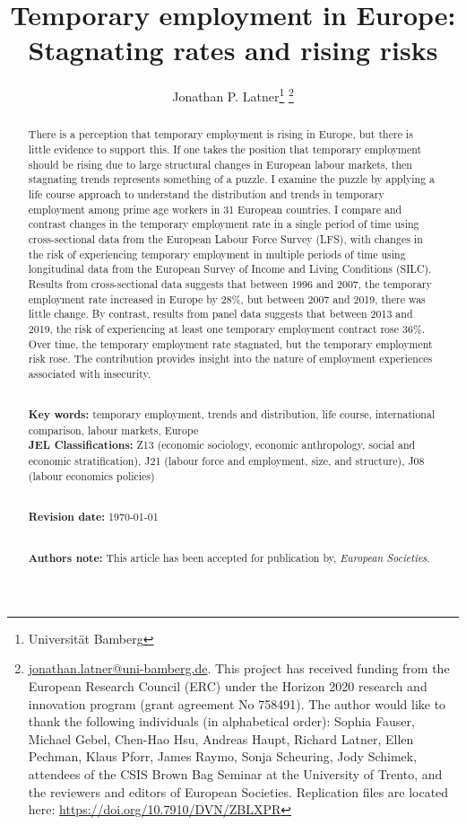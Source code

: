 \documentclass[12pt]{article}
\title{Temporary employment in Europe: Stagnating rates and rising risks}
\author{Jonathan P. Latner\thanks{Universit{\"a}t Bamberg} \footnote{\url{jonathan.latner@uni-bamberg.de}.  This project has received funding from the European Research Council (ERC) under the Horizon 2020 research and innovation program (grant agreement No 758491).  The author would like to thank the following individuals (in alphabetical order):  Sophia Fauser, Michael Gebel, Chen-Hao Hsu, Andreas Haupt, Richard Latner, Ellen Pechman, Klaus Pforr, James Raymo, Sonja Scheuring, Jody Schimek, attendees of the CSIS Brown Bag Seminar at the University of Trento, and the reviewers and editors of European Societies.  Replication files are located here:  \url{https://doi.org/10.7910/DVN/ZBLXPR}}}
\date{\vspace{-5ex}}
\newcommand\wordcounttot{}
\begin{document}
\maketitle

\begin{abstract}

\noindent 
There is a perception that temporary employment is rising in Europe, but there is little evidence to support this.  If one takes the position that temporary employment should be rising due to large structural changes in European labour markets, then stagnating trends represents something of a puzzle.  I examine the puzzle by applying a life course approach to understand the distribution and trends in temporary employment among prime age workers in 31 European countries.  I compare and contrast changes in the temporary employment rate in a single period of time using cross-sectional data from the European Labour Force Survey (LFS), with changes in the risk of experiencing temporary employment in multiple periods of time using longitudinal data from the European Survey of Income and Living Conditions (SILC).  Results from cross-sectional data suggests that between 1996 and 2007, the temporary employment rate increased in Europe by 28\%, but between 2007 and 2019, there was little change.  By contrast, results from panel data suggests that between 2013 and 2019, the risk of experiencing at least one temporary employment contract rose 36\%.  Over time, the temporary employment rate stagnated, but the temporary employment risk rose.  The contribution provides insight into the nature of employment experiences associated with insecurity.  

\noindent
\\
{\bf Key words:} temporary employment, trends and distribution, life course, international comparison, labour markets, Europe \\
{\bf JEL Classifications:} Z13 (economic sociology, economic anthropology, social and economic stratification), J21 (labour force and employment, size, and structure), J08 (labour economics policies)


\noindent
\\
{\bf Revision date:} \today

\noindent
\\
{\bf Authors note:} This article has been accepted for publication by, \emph{European Societies}.  
\end{abstract}
\end{document}
